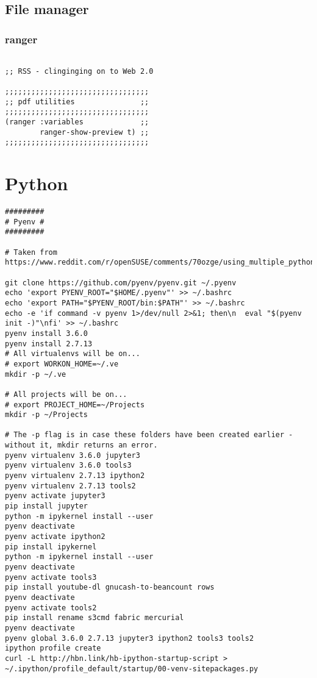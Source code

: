 \documentclass[11pt]{article}
\begin{document}
\subsection{File manager}
\label{sec:org5c34e70}
\subsubsection{ranger}
\label{sec:org32cb29c}

\begin{verbatim}

;; RSS - clinginging on to Web 2.0

;;;;;;;;;;;;;;;;;;;;;;;;;;;;;;;;;
;; pdf utilities               ;;
;;;;;;;;;;;;;;;;;;;;;;;;;;;;;;;;;
(ranger :variables             ;;
        ranger-show-preview t) ;;
;;;;;;;;;;;;;;;;;;;;;;;;;;;;;;;;;
\end{verbatim}

\section{Python}
\label{sec:orgdcfec23}
\begin{verbatim}
#########
# Pyenv #
#########

# Taken from https://www.reddit.com/r/openSUSE/comments/70ozge/using_multiple_python_versions_on_leap/dos6798

git clone https://github.com/pyenv/pyenv.git ~/.pyenv
echo 'export PYENV_ROOT="$HOME/.pyenv"' >> ~/.bashrc
echo 'export PATH="$PYENV_ROOT/bin:$PATH"' >> ~/.bashrc
echo -e 'if command -v pyenv 1>/dev/null 2>&1; then\n  eval "$(pyenv init -)"\nfi' >> ~/.bashrc
pyenv install 3.6.0
pyenv install 2.7.13
# All virtualenvs will be on...
# export WORKON_HOME=~/.ve
mkdir -p ~/.ve 

# All projects will be on...
# export PROJECT_HOME=~/Projects
mkdir -p ~/Projects 

# The -p flag is in case these folders have been created earlier - without it, mkdir returns an error.
pyenv virtualenv 3.6.0 jupyter3
pyenv virtualenv 3.6.0 tools3
pyenv virtualenv 2.7.13 ipython2
pyenv virtualenv 2.7.13 tools2
pyenv activate jupyter3
pip install jupyter
python -m ipykernel install --user
pyenv deactivate
pyenv activate ipython2
pip install ipykernel
python -m ipykernel install --user
pyenv deactivate
pyenv activate tools3
pip install youtube-dl gnucash-to-beancount rows 
pyenv deactivate
pyenv activate tools2
pip install rename s3cmd fabric mercurial
pyenv deactivate
pyenv global 3.6.0 2.7.13 jupyter3 ipython2 tools3 tools2
ipython profile create
curl -L http://hbn.link/hb-ipython-startup-script > ~/.ipython/profile_default/startup/00-venv-sitepackages.py

\end{verbatim}
\end{document}
